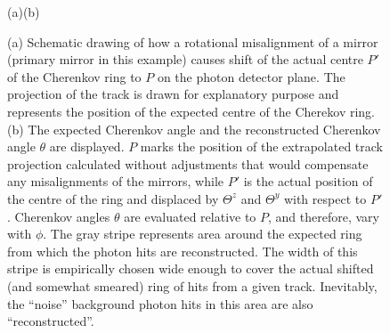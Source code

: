\begin{figure}[hbt]
  \vspace{-0.5\baselineskip}
  \hspace{0.35\textwidth}(a)\hspace{0.52\textwidth}(b)\hspace{0.13\textwidth}
  \vspace{-0.5\baselineskip}
  \caption{
    (a) Schematic drawing of how a rotational misalignment of a \rich mirror (primary mirror in this example) causes shift of the actual centre $P'$ of the Cherenkov ring to $P$ on the photon detector plane. The projection of the track is drawn for explanatory purpose and represents the position of the expected centre of the Cherekov ring. (b) The expected Cherenkov angle \thetaC and the reconstructed Cherenkov angle $\theta$ are displayed. $P$ marks the position of the extrapolated track projection calculated without adjustments that would compensate any misalignments of the \rich mirrors, while $P'$ is the actual position of the centre of the ring and displaced by $\varTheta^z$ and $\varTheta^y$ with respect to $P'$ . Cherenkov angles $\theta$ are evaluated relative to $P$, and therefore, vary with $\phi$. The gray stripe represents area around the expected ring from which the photon hits are reconstructed. The width of this stripe is empirically chosen wide enough to cover the actual shifted (and somewhat smeared) ring of hits from a given track. Inevitably, the ``noise'' background photon hits in this area are also ``reconstructed''.}
  \label{fig:RICH_MisalignmentDiagrams}
  \vspace{-0.5\baselineskip}
\end{figure}

